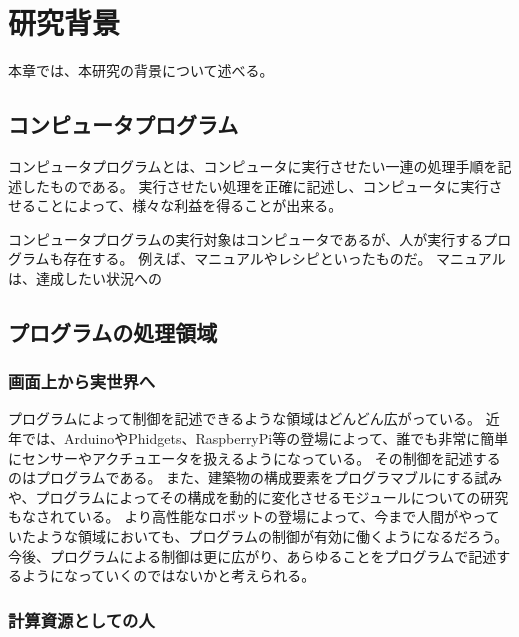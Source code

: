 \chapter{研究背景}\label{chap:background}

本章では、本研究の背景について述べる。

\section{コンピュータプログラム}\label{ux30b3ux30f3ux30d4ux30e5ux30fcux30bfux30d7ux30edux30b0ux30e9ux30e0}

コンピュータプログラムとは、コンピュータに実行させたい一連の処理手順を記述したものである。
実行させたい処理を正確に記述し、コンピュータに実行させることによって、様々な利益を得ることが出来る。

コンピュータプログラムの実行対象はコンピュータであるが、人が実行するプログラムも存在する。
例えば、マニュアルやレシピといったものだ。
マニュアルは、達成したい状況への

\section{プログラムの処理領域}\label{ux30d7ux30edux30b0ux30e9ux30e0ux306eux51e6ux7406ux9818ux57df}

\subsection{画面上から実世界へ}\label{ux753bux9762ux4e0aux304bux3089ux5b9fux4e16ux754cux3078}

プログラムによって制御を記述できるような領域はどんどん広がっている。
近年では、ArduinoやPhidgets、RaspberryPi等の登場によって、誰でも非常に簡単にセンサーやアクチュエータを扱えるようになっている。
その制御を記述するのはプログラムである。
また、建築物の構成要素をプログラマブルにする試みや、プログラムによってその構成を動的に変化させるモジュールについての研究もなされている。
より高性能なロボットの登場によって、今まで人間がやっていたような領域においても、プログラムの制御が有効に働くようになるだろう。
今後、プログラムによる制御は更に広がり、あらゆることをプログラムで記述するようになっていくのではないかと考えられる。

\subsection{計算資源としての人}\label{ux8a08ux7b97ux8cc7ux6e90ux3068ux3057ux3066ux306eux4eba}

